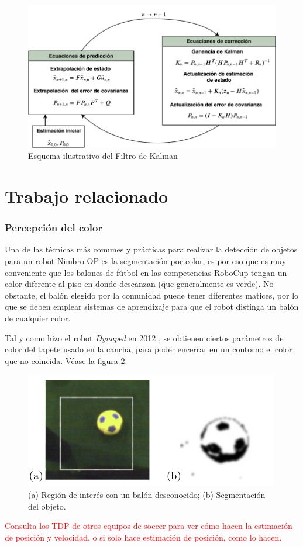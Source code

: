 \begin{figure}
\centering
\includegraphics[scale=0.7]{images/kalman_algorithm.pdf}
\caption{Esquema ilustrativo del Filtro de Kalman}
\label{fig:Kalman_scheme}
\end{figure}

	\section{Trabajo relacionado}
		\subsubsection{Percepción del color}
	Una de las técnicas más comunes y prácticas para realizar la detección de objetos para un robot Nimbro-OP es la segmentación por color, es por eso que es muy conveniente que los balones de fútbol en las competencias RoboCup tengan un color diferente al piso en donde descanzan (que generalmente es verde). No obstante, el balón elegido por la comunidad puede tener diferentes matices, por lo que se deben emplear sistemas de aprendizaje para que el robot distinga un balón de cualquier color. 
	
	Tal y como hizo el robot \textit{Dynaped} en 2012 \citep{missura2012robocup}, se obtienen ciertos parámetros de color del tapete usado en la cancha,  para poder encerrar en un contorno el color que no coincida. Véase la figura \ref{fig:ball_contour_1}.
	
\begin{figure}
\centering
\includegraphics[scale=0.7]{images/ball_contour_1.png}
\caption{(a) Región de interés con un balón desconocido; (b) Segmentación del objeto.}
\label{fig:ball_contour_1}
\end{figure}

	\textcolor{red}{Consulta los TDP de otros equipos de soccer para ver cómo hacen la estimación de posición y velocidad, o si solo hace estimación de posición, como lo hacen.}	
	
	
	
	
	